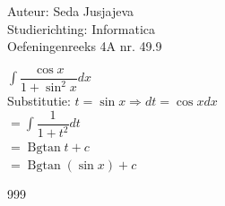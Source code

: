 \documentclass[a4paper]{article}
\newcommand{\integral}{\displaystyle\int}
\begin{document}
\noindent \large Auteur: Seda Jusjajeva\\
\noindent \large Studierichting: Informatica\\
\noindent \large Oefeningenreeks 4A nr. 49.9\\

\medskip

\normalsize

$\integral\dfrac{\cos x}{1 + \sin^2 x}dx$ \\

Substitutie: $t = \sin x \Rightarrow dt = \cos xdx$ \\

$= \integral\dfrac{1}{1 + t^2}dt$ \\

$= \operatorname{Bgtan}t + c$ \\

$= \operatorname{Bgtan}(\sin x) + c$ \\



\begin{thebibliography}{999}
\end{thebibliography}
\end{document}
